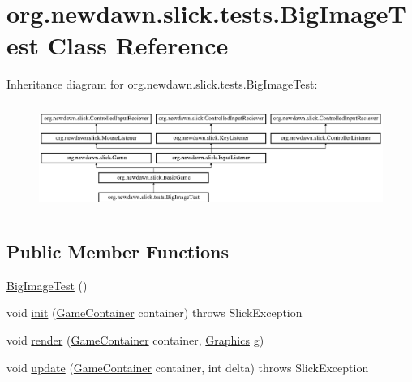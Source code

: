 \hypertarget{classorg_1_1newdawn_1_1slick_1_1tests_1_1_big_image_test}{}\section{org.\+newdawn.\+slick.\+tests.\+Big\+Image\+Test Class Reference}
\label{classorg_1_1newdawn_1_1slick_1_1tests_1_1_big_image_test}
Inheritance diagram for org.\+newdawn.\+slick.\+tests.\+Big\+Image\+Test\+:\begin{figure}[H]
\begin{center}
\leavevmode
\includegraphics[height=3.522012cm]{classorg_1_1newdawn_1_1slick_1_1tests_1_1_big_image_test}
\end{center}
\end{figure}
\subsection*{Public Member Functions}
\begin{DoxyCompactItemize}
\item 
\mbox{\hyperlink{classorg_1_1newdawn_1_1slick_1_1tests_1_1_big_image_test_a60fd75d50b3195c154df6337a25d9155}{Big\+Image\+Test}} ()
\item 
void \mbox{\hyperlink{classorg_1_1newdawn_1_1slick_1_1tests_1_1_big_image_test_a367b06ea6dd10797d44cde38fd09d9d8}{init}} (\mbox{\hyperlink{classorg_1_1newdawn_1_1slick_1_1_game_container}{Game\+Container}} container)  throws Slick\+Exception 
\item 
void \mbox{\hyperlink{classorg_1_1newdawn_1_1slick_1_1tests_1_1_big_image_test_a661408e4f62d8e035a8fcc9c6ead94cb}{render}} (\mbox{\hyperlink{classorg_1_1newdawn_1_1slick_1_1_game_container}{Game\+Container}} container, \mbox{\hyperlink{classorg_1_1newdawn_1_1slick_1_1_graphics}{Graphics}} g)
\item 
void \mbox{\hyperlink{classorg_1_1newdawn_1_1slick_1_1tests_1_1_big_image_test_a03dcbf53e126be0ac0a78e9a3004390d}{update}} (\mbox{\hyperlink{classorg_1_1newdawn_1_1slick_1_1_game_container}{Game\+Container}} container, int delta)  throws Slick\+Exception 
\end{DoxyCompactItemize}
